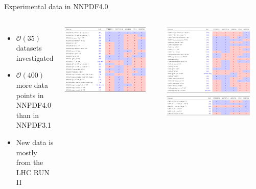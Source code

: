 \documentclass[aspectratio=169,9pt]{beamer}
\begin{document}
\begin{frame}{Experimental data in NNPDF4.0}
	\begin{columns}
	        {\footnotesize
	        \begin{itemize}
	            \item $\mathcal{O}(35)$ datasets investigated
	            \item $\mathcal{O}(400)$ more data points in NNPDF4.0 \\ than in NNPDF3.1
	            \item New data is mostly from the LHC RUN II
	        \end{itemize}
	        }
	        \includegraphics[width=0.9\textwidth]{atlas_data_table}
	
	        \includegraphics[width=0.9\textwidth]{cms_data_table} \\
	        \includegraphics[width=0.9\textwidth]{lhcb_data_table}
	\end{columns}
\end{frame}
\end{document}
